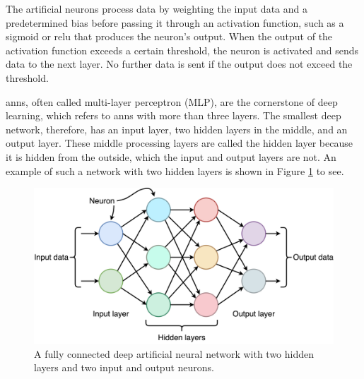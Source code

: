     The artificial neurons process data by weighting the input data and a predetermined bias before passing it through an activation function, such as a sigmoid or \gls{relu} \cite{dubeyActivationFunctionsDeep2022} that produces the neuron's output. When the output of the activation function exceeds a certain threshold, the neuron is activated and sends data to the next layer. No further data is sent if the output does not exceed the threshold.

    
   \glspl{ann}, often called multi-layer perceptron (MLP), are the cornerstone of deep learning, which refers to \glspl{ann} with more than three layers. The smallest deep network, therefore, has an input layer, two hidden layers in the middle, and an output layer. These middle processing layers are called the hidden layer because it is hidden from the outside, which the input and output layers are not. An example of such a network with two hidden layers is shown in Figure \ref{fig:deep_network} to see. 


    \begin{figure}[htb]
        \centering
        \includegraphics[width=\linewidth]{images/deep_neural_network.png}
        \caption{A fully connected deep artificial neural network with two hidden layers and two input and output neurons.} %
        \label{fig:deep_network}
    \end{figure}

